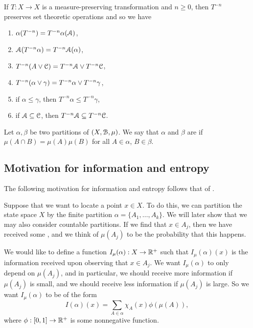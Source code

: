 \begin{remark}
	If $T : X \to X$ is a measure-preserving transformation and $n \geq 0$, then $T^{-n}$ preserves set theoretic operations and so we have
	\begin{enumerate}
		\item $\alpha(T^{-n}) = T^{-n}{\alpha(\mathcal{A})}$,
		\item $\mathcal{A}(T^{-n}{\alpha}) = T^{-n}{\mathcal{A}(\alpha)}$,
		\item $T^{-n}(A \vee \mathcal{C}) = T^{-n}{\mathcal{A}} \vee T^{-n}{\mathcal{C}}$,
		\item $T^{-n}(\alpha \vee \gamma) = T^{-n}{\alpha} \vee T^{-n}{\gamma}$,
		\item if $\alpha \leq \gamma$, then $T^{-n}{\alpha} \leq T^{-n}{\gamma}$,
		\item if $\mathcal{A} \subseteq \mathcal{C}$, then $T^{-n}{\mathcal{A}} \subseteq T^{-n}{\mathcal{C}}$.
	\end{enumerate}
\end{remark}

\begin{definition}
	Let $\alpha, \beta$ be two partitions of $(X, \mathcal{B}, \mu)$. We say that $\alpha$ and $\beta$ are  if $\mu(A \cap B) = \mu(A)\mu(B)$ for all $A \in \alpha$, $B \in \beta$.
\end{definition}

\subsection{Motivation for information and entropy}
The following motivation for information and entropy follows that of \cite[Lecture 23]{ergodic-lectures}.

Suppose that we want to locate a point $x \in X$. To do this, we can partition the state space $X$ by the finite partition $\alpha = \{A_1, \dots, A_k\}$. We will later show that we may also consider countable partitions. If we find that $x \in A_j$, then we have received some , and we think of $\mu(A_j)$ to be the probability that this happens.

We would like to define a function $I_\mu(\alpha) : X \to \mathbb{R}^+$ such that $I_\mu(\alpha)(x)$ is the information received upon observing that $x \in A_j$. We want $I_\mu(\alpha)$ to only depend on $\mu(A_j)$, and in particular, we should receive more information if $\mu(A_j)$ is small, and we should receive less information if $\mu(A_j)$ is large. So we want $I_\mu(\alpha)$ to be of the form
\[
	I(\alpha)(x) = \sum_{A \in \alpha}{\chi_A(x)\phi(\mu(A))},
\]
where $\phi : [0, 1] \to \mathbb{R}^+$ is some nonnegative function.

